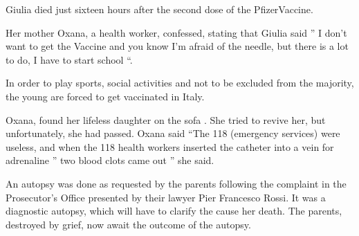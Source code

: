 Giulia died just sixteen hours after the second dose of the PfizerVaccine.

Her mother Oxana, a health worker, confessed, stating that Giulia said ” I don’t
want to get the Vaccine and you know I’m afraid of the needle, but there is a
lot to do, I have to start school “.

In order to play sports, social activities and not to be excluded from the
majority, the young are forced to get vaccinated in Italy.

Oxana, found her lifeless daughter on the sofa . She tried to revive her, but
unfortunately, she had passed. Oxana said “The 118 (emergency services) were
useless, and when the 118 health workers inserted the catheter into a vein for
adrenaline ” two blood clots came out ” she said.

An autopsy was done as requested by the parents following the complaint in the
Prosecutor’s Office presented by their lawyer Pier Francesco Rossi. It was a
diagnostic autopsy, which will have to clarify the cause her death. The parents,
destroyed by grief, now await the outcome of the autopsy.

